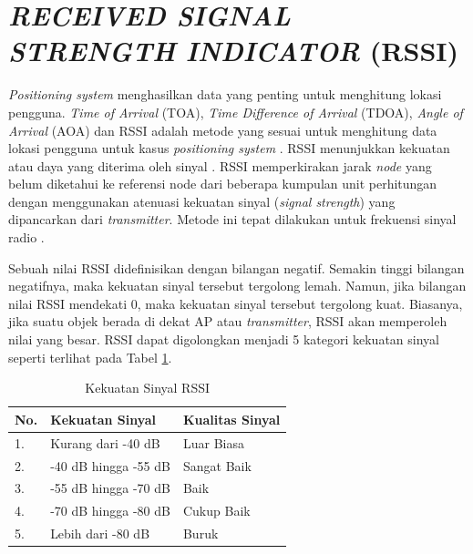 \section{\uppercase{\textit{RECEIVED SIGNAL STRENGTH INDICATOR} (RSSI)}}
\textit{Positioning system} menghasilkan data yang penting untuk menghitung lokasi pengguna. \textit{Time of Arrival} (TOA), \textit{Time Difference of Arrival} (TDOA), \textit{Angle of Arrival} (AOA) dan RSSI adalah metode yang sesuai untuk menghitung data lokasi pengguna untuk kasus \textit{positioning system} \citep{Liu2007}. RSSI menunjukkan kekuatan atau daya yang diterima oleh sinyal \citep{Kajioka2014}. RSSI memperkirakan jarak \textit{node} yang belum diketahui ke referensi node dari beberapa kumpulan unit perhitungan dengan menggunakan atenuasi kekuatan sinyal (\textit{signal strength}) yang dipancarkan dari \textit{transmitter}. Metode ini tepat dilakukan untuk frekuensi sinyal radio \citep{Schneegans2007}.

\par Sebuah nilai RSSI didefinisikan dengan bilangan negatif. Semakin tinggi bilangan negatifnya, maka kekuatan sinyal tersebut tergolong lemah. Namun, jika bilangan nilai RSSI mendekati 0, maka kekuatan sinyal tersebut tergolong kuat. Biasanya, jika suatu objek berada di dekat AP atau \textit{transmitter}, RSSI akan memperoleh nilai yang besar. RSSI dapat digolongkan menjadi 5 kategori kekuatan sinyal seperti terlihat pada Tabel \ref{t_rssi}.

\begin{table}[H]
	\centering
	\caption{Kekuatan Sinyal RSSI \citep{VerisIndustries2013}}
	\label{t_rssi}
	\begin{tabular}{|l|l|l|}
		\hline
		\textbf{No.} & \textbf{Kekuatan Sinyal} & \textbf{Kualitas Sinyal} \\
		\hline
		1.           & Kurang dari -40 dB       & Luar Biasa               \\
		\hline
		2.           & -40 dB hingga -55 dB     & Sangat Baik              \\
		\hline
		3.           & -55 dB hingga -70 dB     & Baik                     \\
		\hline
		4.           & -70 dB hingga -80 dB     & Cukup Baik               \\
		\hline
		5.           & Lebih dari -80 dB        & Buruk                    \\
		\hline
	\end{tabular}
\end{table}

